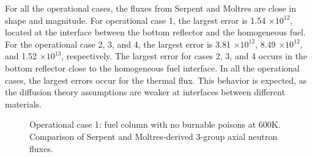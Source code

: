 For all the operational cases, the fluxes from Serpent and Moltres are close in shape and magnitude.
For operational case 1, the largest error is 1.54 $\times 10^12$, located at the interface between the bottom reflector and the homogeneous fuel.
For the operational case 2, 3, and 4, the largest error is 3.81 $\times 10^12$, 8.49 $\times 10^12$, and 1.52 $\times 10^13$, respectively.
The largest error for cases 2, 3, and 4 occurs in the bottom reflector close to the homogeneous fuel interface.
In all the operational cases, the largest errors occur for the thermal flux.
This behavior is expected, as the diffusion theory assumptions are weaker at interfaces between different materials.

\begin{figure}[htbp!]
	\centering
	\hfill
  \caption{Operational case 1: fuel column with no burnable poisons at 600K. Comparison of Serpent and Moltres-derived 3-group axial neutron fluxes.}
	\label{fig:assembly-noLBP-600-flux}
\end{figure}


